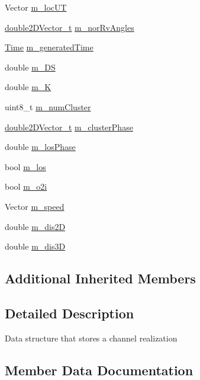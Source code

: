 \begin{DoxyCompactItemize}
Vector \hyperlink{structns3_1_1Params3gpp_acb8c0f3ca9cd1c79a65d7cfc370e50c8}{m\+\_\+loc\+UT}
\item 
\hyperlink{namespacens3_a908ae777c72964ccedbcf2310527a67e}{double2\+D\+Vector\+\_\+t} \hyperlink{structns3_1_1Params3gpp_ac92aeebaed8fe6a7ef4dabea688e1627}{m\+\_\+nor\+Rv\+Angles}
\item 
\hyperlink{classns3_1_1Time}{Time} \hyperlink{structns3_1_1Params3gpp_ad0c918a71f2f4c3db69ec73ee58db404}{m\+\_\+generated\+Time}
\item 
double \hyperlink{structns3_1_1Params3gpp_aac62234840e679f7469cc9d88129869d}{m\+\_\+\+DS}
\item 
double \hyperlink{structns3_1_1Params3gpp_a7644e03a40feca61b284e49dd6e03d55}{m\+\_\+K}
\item 
uint8\+\_\+t \hyperlink{structns3_1_1Params3gpp_a9b8bc86efc6fdaf4379892bcfc6d1e04}{m\+\_\+num\+Cluster}
\item 
\hyperlink{namespacens3_a908ae777c72964ccedbcf2310527a67e}{double2\+D\+Vector\+\_\+t} \hyperlink{structns3_1_1Params3gpp_aca9e20a9d49633ad96c4a5781f3b02c7}{m\+\_\+cluster\+Phase}
\item 
double \hyperlink{structns3_1_1Params3gpp_a443814e9ef33528a76dea3f7486d0148}{m\+\_\+los\+Phase}
\item 
bool \hyperlink{structns3_1_1Params3gpp_a74ff0c53b000285579b99a546bf23c44}{m\+\_\+los}
\item 
bool \hyperlink{structns3_1_1Params3gpp_a940508e269c7f47fd2364336c801cd42}{m\+\_\+o2i}
\item 
Vector \hyperlink{structns3_1_1Params3gpp_a81983955b71438a4a7974abf24575839}{m\+\_\+speed}
\item 
double \hyperlink{structns3_1_1Params3gpp_a4e8aa0ff522f8d262006b5acb9b388d8}{m\+\_\+dis2D}
\item 
double \hyperlink{structns3_1_1Params3gpp_a53b1a54ca1498e7a80ccaeef5b6f3d23}{m\+\_\+dis3D}
\end{DoxyCompactItemize}
\subsection*{Additional Inherited Members}


\subsection{Detailed Description}
Data structure that stores a channel realization 

\subsection{Member Data Documentation}
